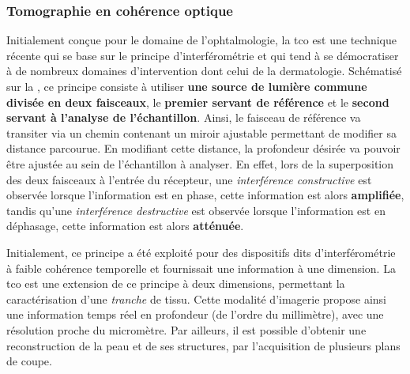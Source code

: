 \subsubsection{Tomographie en cohérence optique}
Initialement conçue pour le domaine de l’ophtalmologie, la \gls{tco} est une technique récente qui se base sur le principe d’interférométrie et qui tend à se démocratiser à de nombreux domaines d’intervention dont celui de la dermatologie. Schématisé sur la , ce principe consiste à utiliser \textbf{une source de lumière commune divisée en deux faisceaux}, le \textbf{premier servant de référence} et le \textbf{second servant à l’analyse de l’échantillon}. Ainsi, le faisceau de référence va transiter via un chemin contenant un miroir ajustable permettant de modifier sa distance parcourue. En modifiant cette distance, la profondeur désirée va pouvoir être ajustée au sein de l'échantillon à analyser. En effet, lors de la superposition des deux faisceaux à l'entrée du récepteur, une \textit{interférence constructive} est observée lorsque l'information est en phase, cette information est alors \textbf{amplifiée}, tandis qu'une \textit{interférence destructive} est observée lorsque l'information est en déphasage, cette information est alors \textbf{atténuée}.\par

Initialement, ce principe a été exploité pour des dispositifs dits d’interférométrie à faible cohérence temporelle et fournissait une information à une dimension. La \gls{tco} est une extension de ce principe à deux dimensions, permettant la caractérisation d’une \textit{tranche} de tissu. Cette modalité d’imagerie propose ainsi une information temps réel en profondeur (de l’ordre du millimètre), avec une résolution proche du micromètre. Par ailleurs, il est possible d'obtenir une reconstruction de la peau et de ses structures, par l'acquisition de plusieurs plans de coupe.\par

